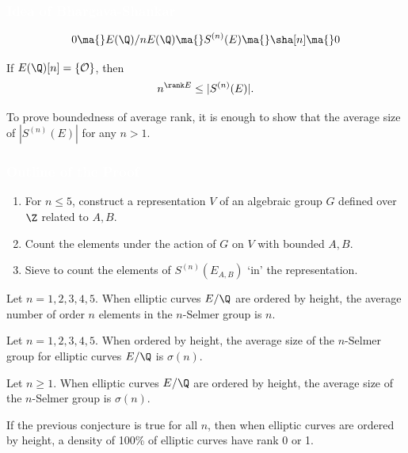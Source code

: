 \begin{frame}
\frametitle{\textcolor{white}{Idea of Bhargava-Shankar}}
	\[
	0 \ma{} E(\Q)/nE(\Q) \ma{} S^{(n)}(E) \ma{} \sha[n] \ma{} 0
	\] \vfill
	
If $E(\Q)[n]= \{\mathcal{O}\}$, then
	\[
	n^{\rank E} \leq |S^{(n)}(E)|.
	\] \pause \vspace{0.3cm}

To prove boundedness of average rank, it is enough to show that the average size of $|S^{(n)}(E)|$ for any $n>1$. 
\end{frame}



\begin{frame}
\frametitle{\textcolor{white}{Outline of the Proof}}
\begin{enumerate}[1.]
\item For $n \leq 5$, construct a representation $V$ of an algebraic group $G$ defined over $\Z$ related to $A,B$.
\item Count the elements under the action of $G$ on $V$ with bounded $A,B$.
\item Sieve to count the elements of $S^{(n)}(E_{A,B})$ `in' the representation.
\end{enumerate}
\end{frame}



\begin{frame}
\begin{thm}
Let $n=1,2,3,4,5$. When elliptic curves $E/\Q$ are ordered by height, the average number of order $n$ elements in the $n$-Selmer group is $n$.
\end{thm} \pause

\begin{cor}
Let $n= 1,2,3,4,5$. When ordered by height, the average size of the $n$-Selmer group for elliptic curves $E/\Q$ is $\sigma(n)$.
\end{cor} \pause

\begin{conj}
Let $n \geq 1$. When elliptic curves $E/\Q$ are ordered by height, the average size of the $n$-Selmer group is $\sigma(n)$.
\end{conj}
\end{frame}



\begin{frame}
\begin{prop}
If the previous conjecture is true for all $n$, then when elliptic curves are ordered by height, a density of 100\% of elliptic curves have rank 0 or 1. 
\end{prop}
\end{frame}



